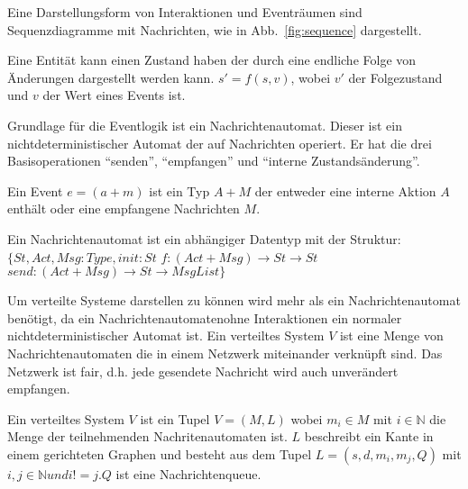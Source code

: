 Eine Darstellungsform von Interaktionen und Eventräumen sind Sequenzdiagramme
mit Nachrichten, wie in Abb.~\ref{fig:sequence} dargestellt.


\begin{defi}
  Eine Entität kann einen Zustand haben der durch eine endliche Folge
  von Änderungen dargestellt werden kann. $s'=f(s,v)$, wobei
  $v'$ der Folgezustand und $v$ der Wert eines Events ist.  
\end{defi}



Grundlage für die Eventlogik ist ein Nachrichtenautomat. Dieser ist ein
nichtdeterministischer Automat der auf Nachrichten operiert.
Er hat die drei Basisoperationen ``senden'', ``empfangen'' und ``interne
Zustandsänderung''.~\cite{bickford2003logic}

\begin{defi}
  Ein Event $e=(a+m)$ ist ein Typ $A+M$ der entweder eine interne Aktion $A$ enthält
  oder eine empfangene Nachrichten $M$.
\end{defi}

\begin{defi}
  Ein Nachrichtenautomat ist ein abhängiger Datentyp mit der Struktur:
  $\{St, Act, Msg: Type, init: St$
    $f:(Act+Msg)\rightarrow St\rightarrow St$
    $send:(Act+Msg)\rightarrow St\rightarrow MsgList\}$  
\end{defi}

Um verteilte Systeme darstellen zu können wird mehr als ein Nachrichtenautomat
benötigt, da ein Nachrichtenautomatenohne Interaktionen ein normaler
nichtdeterministischer Automat ist. Ein verteiltes System $V$ ist eine Menge von
Nachrichtenautomaten die in einem Netzwerk miteinander verknüpft sind.
Das Netzwerk ist fair, d.h. jede gesendete Nachricht wird auch unverändert
empfangen.~\cite{bickford2003logic}

\begin{defi}
  Ein verteiltes System $V$ ist ein Tupel $V=(M,L)$ wobei $m_i\in M$ mit $i\in
  \mathbb{N}$ die Menge der teilnehmenden Nachritenautomaten ist. $L$ beschreibt
  ein Kante in einem gerichteten Graphen und besteht aus dem Tupel $L=(s,d,m_i,m_j,Q)$ 
  mit $i,j\in \mathbb{N} und i!= j.Q$ ist eine Nachrichtenqueue.
\end{defi}

